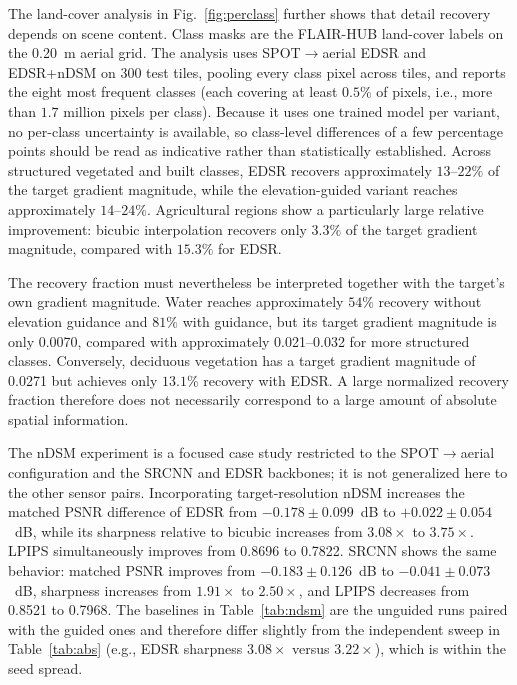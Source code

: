 \documentclass[conference]{IEEEtran}
\begin{document}
The land-cover analysis in Fig.~\ref{fig:perclass} further shows that
detail recovery depends on scene content. Class masks are the
FLAIR-HUB land-cover labels on the 0.20~m aerial grid. The analysis
uses SPOT$\rightarrow$aerial EDSR and EDSR+nDSM on 300 test tiles,
pooling every class pixel across tiles, and reports the eight most
frequent classes (each covering at least $0.5\%$ of pixels, i.e.,
more than $1.7$ million pixels per class). Because it uses one
trained model per variant, no per-class uncertainty is available, so
class-level differences of a few percentage points should be read as
indicative rather than statistically established. Across structured vegetated
and built classes, EDSR recovers approximately $13$--$22\%$ of the
target gradient magnitude, while the elevation-guided variant reaches
approximately $14$--$24\%$. Agricultural regions show a particularly
large relative improvement: bicubic interpolation recovers only
$3.3\%$ of the target gradient magnitude, compared with $15.3\%$
for EDSR.

The recovery fraction must nevertheless be interpreted together with
the target's own gradient magnitude. Water reaches approximately
$54\%$ recovery without elevation guidance and $81\%$ with guidance,
but its target gradient magnitude is only 0.0070, compared with
approximately 0.021--0.032 for more structured classes. Conversely,
deciduous vegetation has a target gradient magnitude of 0.0271 but
achieves only $13.1\%$ recovery with EDSR. A large normalized recovery
fraction therefore does not necessarily correspond to a large amount
of absolute spatial information.



The nDSM experiment is a focused case study restricted to the
SPOT$\rightarrow$aerial configuration and the SRCNN and EDSR backbones;
it is not generalized here to the other sensor pairs. Incorporating target-resolution
nDSM increases the matched PSNR difference of EDSR from
$-0.178\pm0.099$~dB to $+0.022\pm0.054$~dB, while its sharpness relative to bicubic
increases from $3.08\times$ to $3.75\times$. LPIPS simultaneously
improves from 0.8696 to 0.7822. SRCNN shows the same behavior:
matched PSNR improves from $-0.183\pm0.126$~dB to
$-0.041\pm0.073$~dB, sharpness increases from $1.91\times$ to
$2.50\times$, and LPIPS decreases from 0.8521 to 0.7968. The
baselines in Table~\ref{tab:ndsm} are the unguided runs paired with
the guided ones and therefore differ slightly from the independent
sweep in Table~\ref{tab:abs} (e.g., EDSR sharpness $3.08\times$
versus $3.22\times$), which is within the seed spread.
\end{document}
